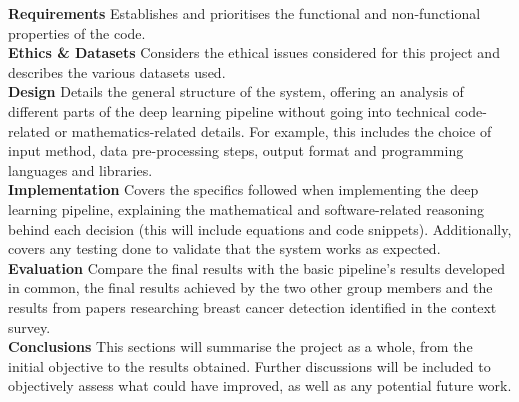 \textbf{Requirements} \space
Establishes and prioritises the functional and non-functional properties of the code.\\

\textbf{Ethics \& Datasets} \space
Considers the ethical issues considered for this project and describes the various datasets used.\\

\textbf{Design} \space
Details the general structure of the system, offering an analysis of different parts of the deep learning pipeline without going into technical code-related or mathematics-related details. For example, this includes the choice of input method, data pre-processing steps, output format and programming languages and libraries.\\

\textbf{Implementation} \space
Covers the specifics followed when implementing the deep learning pipeline, explaining the mathematical and software-related reasoning behind each decision (this will include equations and code snippets). Additionally, covers any testing done to validate that the system works as expected.\\

\textbf{Evaluation} \space
Compare the final results with the basic pipeline’s results developed in common, the final results achieved by the two other group members and the results from papers researching breast cancer detection identiﬁed in the context survey.\\

\textbf{Conclusions} \space
This sections will summarise the project as a whole, from the initial objective to the results obtained. Further discussions will be included to objectively assess what could have improved, as well as any potential future work.